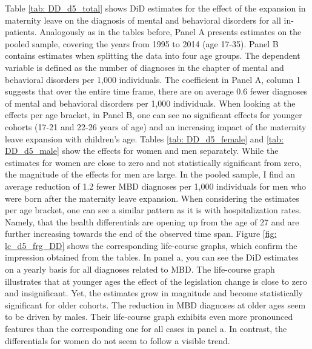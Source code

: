 \documentclass[11pt, a4paper,draft]{article} %
\begin{document}
Table \ref{tab: DD_d5_total} shows DiD estimates for the effect of the expansion in maternity leave on the diagnosis of mental and behavioral disorders for all in-patients. Analogously as in the tables before, Panel A presents estimates on the pooled sample, covering the years from 1995 to 2014 (age 17-35). Panel B contains estimates when splitting the data into four age groups. The dependent variable is defined as the number of diagnoses in the chapter of mental and behavioral disorders per 1,000 individuals. The coefficient in Panel A, column 1 suggests that over the entire time frame, there are on average 0.6 fewer diagnoses of mental and behavioral disorders per 1,000 individuals. When looking at the effects per age bracket, in Panel B, one can see no significant effects for younger cohorts (17-21 and 22-26 years of age) and an increasing impact of the maternity leave expansion with children's age. Tables \ref{tab: DD_d5_female} and \ref{tab: DD_d5_male} show the effects for women and men separately. While the estimates for women are close to zero and not statistically significant from zero, the magnitude of the effects for men are large. In the pooled sample, I find an average reduction of 1.2 fewer MBD diagnoses per 1,000 individuals for men who were born after the maternity leave expansion. When considering the estimates per age bracket, one can see a similar pattern as it is with hospitalization rates. Namely, that the health differentials are opening up from the age of 27 and are further increasing towards the end of the observed time span. Figure \ref{fig: lc_d5_frg_DD} shows the corresponding life-course graphs, which confirm the impression obtained from the tables. In panel a, you can see the DiD estimates on a yearly basis for all diagnoses related to MBD. The life-course graph illustrates that at younger ages the effect of the legislation change is close to zero and insignificant. Yet, the estimates grow in magnitude and become statistically significant for older cohorts. The reduction in MBD diagnoses at older ages seem to be driven by males. Their life-course graph exhibits even more pronounced features than the corresponding one for all cases in panel a. In contrast, the differentials for women do not seem to follow a visible trend. \newline
\end{document}
